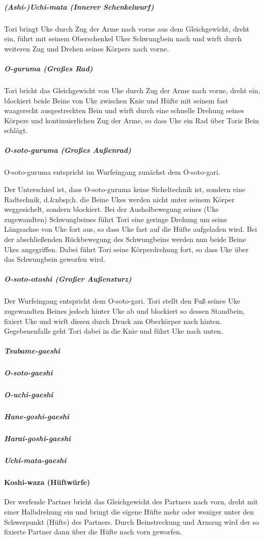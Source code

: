\documentclass[justified, a4paper, notitlepage, captions=tableheading, nobib]{tufte-handout}
\begin{document}
\subparagraph{(Ashi-)Uchi-mata (Innerer Schenkelwurf)}
\label{sec:org078e6e2}
Tori bringt Uke durch Zug der Arme nach vorne aus dem Gleichgewicht, dreht ein, führt mit seinem Oberschenkel Ukes Schwungbein nach und wirft durch weiteren Zug und Drehen seines Körpers nach vorne.

\subparagraph{O-guruma (Großes Rad)}
\label{sec:orgd2eea7b}
Tori bricht das Gleichgewicht von Uke durch Zug der Arme nach vorne, dreht ein, blockiert beide Beine von Uke zwischen Knie und Hüfte mit seinem fast waagerecht ausgestreckten Bein und wirft durch eine schnelle Drehung seines Körpers und kontinuierlichen Zug der Arme, so dass Uke ein Rad über Toris Bein schlägt.

\subparagraph{O-soto-guruma (Großes Außenrad)}
\label{sec:org3fae38c}
O-soto-guruma entspricht im Wurfeingang zunächst dem O-soto-gari.

Der Unterschied ist, dass O-soto-guruma keine Sicheltechnik ist, sondern eine Radtechnik, d.\&nbsp;h. die Beine Ukes werden nicht unter seinem Körper weggesichelt, sondern blockiert. Bei der Ausholbewegung seines (Uke zugewandten) Schwungbeines führt Tori eine geringe Drehung um seine Längsachse von Uke fort aus, so dass Uke fast auf die Hüfte aufgeladen wird. Bei der abschließenden Rückbewegung des Schwungbeins werden nun beide Beine Ukes angegriffen. Dabei führt Tori seine Körperdrehung fort, so dass Uke über das Schwungbein geworfen wird.

\subparagraph{O-soto-otoshi (Großer Außensturz)}
\label{sec:orge71a770}
Der Wurfeingang entspricht dem O-soto-gari. Tori stellt den Fuß seines Uke zugewandten Beines jedoch hinter Uke ab und blockiert so dessen Standbein, fixiert Uke und wirft diesen durch Druck am Oberkörper nach hinten. Gegebenenfalls geht Tori dabei in die Knie und führt Uke nach unten.

\subparagraph{Tsubame-gaeshi}
\label{sec:orgb34a22d}
\subparagraph{O-soto-gaeshi}
\label{sec:orga99bd19}
\subparagraph{O-uchi-gaeshi}
\label{sec:org584c5de}
\subparagraph{Hane-goshi-gaeshi}
\label{sec:org551fa0c}
\subparagraph{Harai-goshi-gaeshi}
\label{sec:org664d075}
\subparagraph{Uchi-mata-gaeshi}
\label{sec:orgb857159}

\paragraph{Koshi-waza (Hüftwürfe) }
\label{sec:org4f27965}

Der werfende Partner bricht das Gleichgewicht des Partners nach vorn, dreht mit einer Halbdrehung ein und bringt die eigene Hüfte mehr oder weniger unter den Schwerpunkt (Hüfte) des Partners. Durch Beinstreckung und Armzug wird der so fixierte Partner dann über die Hüfte nach vorn geworfen.
\end{document}
